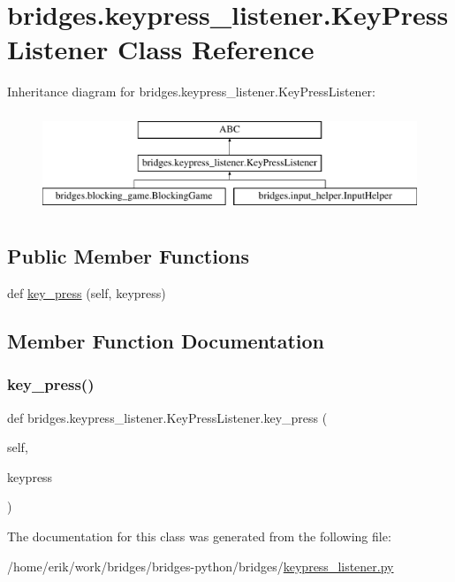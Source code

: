 \hypertarget{classbridges_1_1keypress__listener_1_1_key_press_listener}{}\section{bridges.\+keypress\+\_\+listener.\+Key\+Press\+Listener Class Reference}
\label{classbridges_1_1keypress__listener_1_1_key_press_listener}
Inheritance diagram for bridges.\+keypress\+\_\+listener.\+Key\+Press\+Listener\+:\begin{figure}[H]
\begin{center}
\leavevmode
\includegraphics[height=3.000000cm]{classbridges_1_1keypress__listener_1_1_key_press_listener}
\end{center}
\end{figure}
\subsection*{Public Member Functions}
\begin{DoxyCompactItemize}
\item 
def \hyperlink{classbridges_1_1keypress__listener_1_1_key_press_listener_a0a7b29de00fd412da075d30b8aa61f0d}{key\+\_\+press} (self, keypress)
\end{DoxyCompactItemize}


\subsection{Member Function Documentation}
\mbox{\label{classbridges_1_1keypress__listener_1_1_key_press_listener_a0a7b29de00fd412da075d30b8aa61f0d}} 
\subsubsection{\texorpdfstring{key\+\_\+press()}{key\_press()}}
{\footnotesize\ttfamily def bridges.\+keypress\+\_\+listener.\+Key\+Press\+Listener.\+key\+\_\+press (\begin{DoxyParamCaption}\item[{}]{self,  }\item[{}]{keypress }\end{DoxyParamCaption})}



The documentation for this class was generated from the following file\+:\begin{DoxyCompactItemize}
\item 
/home/erik/work/bridges/bridges-\/python/bridges/\hyperlink{keypress__listener_8py}{keypress\+\_\+listener.\+py}\end{DoxyCompactItemize}
